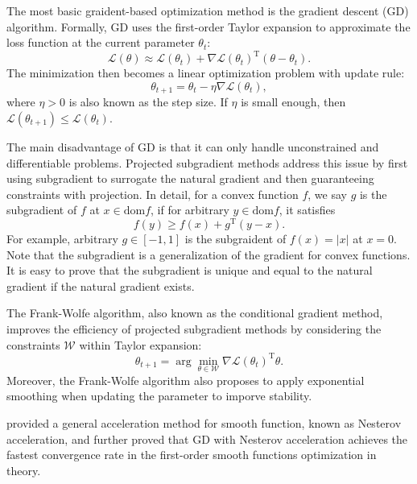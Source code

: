 \documentclass[a4paper,11pt]{article}
\begin{document}
The most basic graident-based optimization method is the gradient descent (GD) algorithm. Formally, GD uses the first-order Taylor expansion to approximate the loss function at the current parameter $\theta_t$: $$\mathcal{L}(\theta) \approx \mathcal{L}(\theta_t) + \nabla \mathcal{L}(\theta_t)^\mathrm{T}(\theta - \theta_t).$$ The minimization then becomes a linear optimization problem with update rule: $$\theta_{t+1} = \theta_t - \eta \nabla \mathcal{L}(\theta_t),$$ where $\eta > 0$ is also known as the step size. If $\eta$ is small enough, then $\mathcal{L}(\theta_{t+1}) \le \mathcal{L}(\theta_{t})$.

The main disadvantage of GD is that it can only handle unconstrained and differentiable problems. Projected subgradient methods address this issue by first using subgradient to surrogate the natural gradient and then guaranteeing constraints with projection. In detail, for a convex function $f$, we say $g$ is the subgradient of $f$ at $x \in \mathrm{dom} f$, if for arbitrary $y \in \mathrm{dom}f$, it satisfies $$f(y) \ge f(x) + g^\mathrm{T}(y - x).$$ For example, arbitrary $g \in [-1, 1]$ is the subgraident of $f(x) = |x|$ at $x = 0$. Note that the subgradient is a generalization of the gradient for convex functions. It is easy to prove that the subgradient is unique and equal to the natural gradient if the natural gradient exists.

The Frank-Wolfe algorithm, also known as the conditional gradient method, improves the efficiency of projected subgradient methods by considering the constraints $\mathcal{W}$ within Taylor expansion: $$\theta_{t+1} = \arg\min_{\theta \in \mathcal{W}} \nabla\mathcal{L}(\theta_t)^\mathrm{T}\theta.$$ Moreover, the Frank-Wolfe algorithm also proposes to apply exponential smoothing when updating the parameter to imporve stability.

\citet{nesterov1983method} provided a general acceleration method for smooth function, known as Nesterov acceleration, and further proved that GD with Nesterov acceleration achieves the fastest convergence rate in the first-order smooth functions optimization in theory. 
\end{document}
